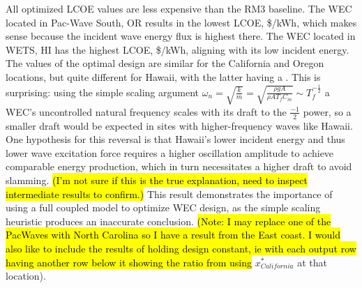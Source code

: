 All optimized LCOE values are less expensive than the RM3 baseline.
The WEC located in Pac-Wave South, OR results in the lowest LCOE, \$\LCOEPacWaveNorth/kWh, which makes sense because the incident wave energy flux is highest there.
The WEC located in WETS, HI has the highest LCOE, \$\LCOEHawaii/kWh, aligning with its low incident energy.
The values of the optimal design are similar for the California and Oregon locations, but quite different for Hawaii, with the latter having a \HawaiiDesignCharacteristics.
This is surprising: using the simple scaling argument $\omega_n = \sqrt{\frac{k}{m}}=\sqrt{\frac{\rho g A}{\rho A T_f C_m}}\sim T_f^{-\frac{1}{2}}$ a WEC's uncontrolled natural frequency scales with its draft to the $\frac{-1}{2}$ power, so a smaller draft would be expected in sites with higher-frequency waves like Hawaii.
One hypothesis for this reversal is that Hawaii's lower incident energy and thus lower wave excitation force requires a higher oscillation amplitude to achieve comparable energy production, which in turn necessitates a higher draft to avoid slamming.
\hl{(I'm not sure if this is the true explanation, need to inspect intermediate results to confirm.)}
This result demonstrates the importance of using a full coupled model to optimize WEC design, as the simple scaling heuristic produces an inaccurate conclusion.
\hl{(Note: I may replace one of the PacWaves with North Carolina so I have a result from the East coast.
I would also like to include the results of holding design constant, ie with each output row having another row below it showing the ratio from using} $x^*_{California}$ at that location).



